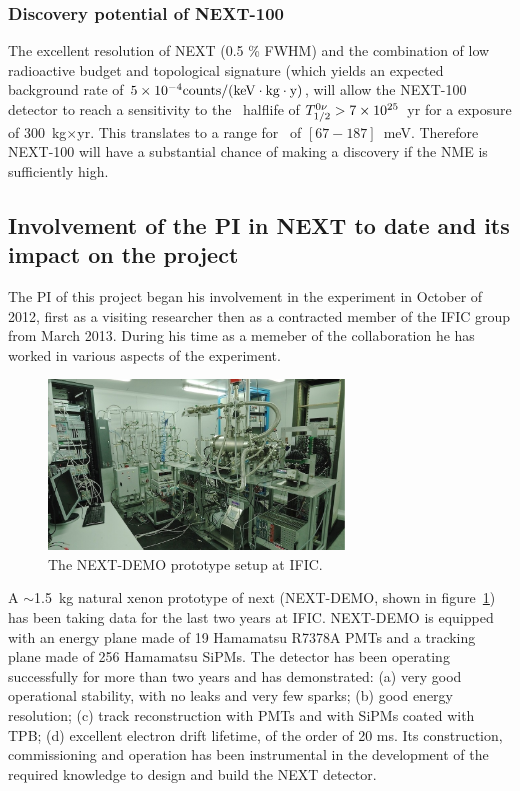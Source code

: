 \documentclass[a4paper,11pt,oneside]{article}
\begin{document}
\subsubsection*{Discovery potential of NEXT-100}
The excellent resolution of NEXT (0.5 \% FWHM) and the combination of low radioactive budget and topological signature (which yields an expected background rate of $5 \times 10^{-4} \rm counts/(keV \cdot kg \cdot y)$, will allow the NEXT-100 detector to reach a sensitivity to the \bbonu\ halflife of $T_{1/2}^{0\nu} > 7 \times 10^{25}$~yr for a exposure of 300~kg$\times$yr. This translates to a range for \mbb\ of $[67-187]$~meV. Therefore NEXT-100 will have a substantial chance of making a discovery if the NME is sufficiently high.

\subsection*{Involvement of the PI in NEXT to date and its impact on the project}
\label{subSec:Past}
The PI of this project began his involvement in the experiment in October of 2012, first as a visiting researcher then as a contracted member of the IFIC group from March 2013. During his time as a memeber of the collaboration he has worked in various aspects of the experiment. 
\begin{figure}
  \centering
  \includegraphics[width=0.7\textwidth]{img/DemoSetup.jpg}
  \caption{\small The NEXT-DEMO prototype setup at IFIC.} \label{fig.DEMO}
\end{figure}
A $\sim$1.5~kg natural xenon prototype of next (NEXT-DEMO, shown in figure~\ref{fig.DEMO}) has been taking data for the last two years at IFIC. NEXT-DEMO is  equipped with an energy plane made of 19 Hamamatsu R7378A PMTs and a tracking plane made of 256 Hamamatsu SiPMs. The detector has been operating successfully for more than two years and has demonstrated: (a) very good operational stability, with no leaks and very few sparks; (b) good energy resolution; (c) track reconstruction with PMTs and with SiPMs coated with TPB; (d) excellent electron drift lifetime, of the order of 20 ms. Its construction, commissioning and operation has been instrumental in the development of the required knowledge to design and build the NEXT detector.
\end{document}
